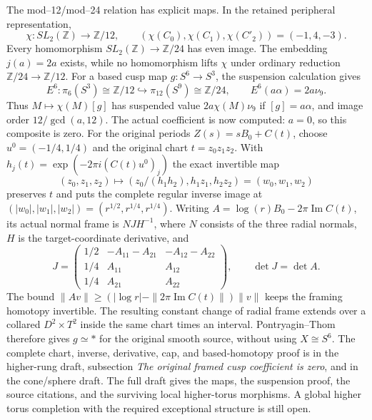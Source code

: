 \documentclass[10pt,letterpaper]{article}
\begin{document}
The mod--12/mod--24 relation has explicit maps. In the retained peripheral
representation,
\[
 \chi:SL_2(\mathbb Z)\longrightarrow\mathbb Z/12,\qquad
 (\chi(C_0),\chi(C_1),\chi(C'_2))=(-1,4,-3).
\]
Every homomorphism $SL_2(\mathbb Z)\to\mathbb Z/24$ has even image.
The embedding $j(a)=2a$ exists, while no homomorphism lifts $\chi$
under ordinary reduction $\mathbb Z/24\to\mathbb Z/12$.
For a based cusp map $g:S^6\to S^3$, the suspension calculation gives
\[
 E^6:\pi_6(S^3)\cong\mathbb Z/12
       \hookrightarrow\pi_{12}(S^9)\cong\mathbb Z/24,
 \qquad E^6(a\alpha)=2a\nu_9.
\]
Thus $M\mapsto\chi(M)[g]$ has suspended value $2a\chi(M)\nu_9$ if
$[g]=a\alpha$, and image order $12/\gcd(a,12)$.
The actual coefficient is now computed: $a=0$, so this composite is zero.
For the original periods $Z(s)=sB_0+C(t)$, choose
$u^0=(-1/4,1/4)$ and the original chart $t=z_0z_1z_2$.
With $h_j(t)=\exp(-2\pi i(C(t)u^0)_j)$ the exact invertible map
\[
 (z_0,z_1,z_2)\longmapsto
 (z_0/(h_1h_2),h_1z_1,h_2z_2)=(w_0,w_1,w_2)
\]
preserves $t$ and puts the complete regular inverse image at
$(|w_0|,|w_1|,|w_2|)=(r^{1/2},r^{1/4},r^{1/4})$.
Writing $A=\log(r)B_0-2\pi\operatorname{Im}C(t)$, its actual
normal frame is $NJH^{-1}$, where $N$ consists of the three radial
normals, $H$ is the target-coordinate derivative, and
\[
 J=\begin{pmatrix}
 1/2&-A_{11}-A_{21}&-A_{12}-A_{22}\\
 1/4&A_{11}&A_{12}\\1/4&A_{21}&A_{22}
 \end{pmatrix},\qquad \det J=\det A.
\]
The bound $\|Av\|\geq(|\log r|-\|2\pi\operatorname{Im}C(t)\|)\|v\|$
keeps the framing homotopy invertible. The resulting constant change of
radial frame extends over a collared $D^2\times T^2$ inside the same
chart times an interval. Pontryagin--Thom therefore gives $g\simeq *$
for the original smooth source, without using $X\cong S^6$.
The complete chart, inverse, derivative, cap, and based-homotopy proof
is in the higher-rung draft, subsection \emph{The original framed cusp
coefficient is zero}, and in the cone/sphere draft.
The full draft gives the maps, the suspension proof, the source citations,
and the surviving local higher-torus morphisms. A global higher torus
completion with the required exceptional structure is still open.
\end{document}
